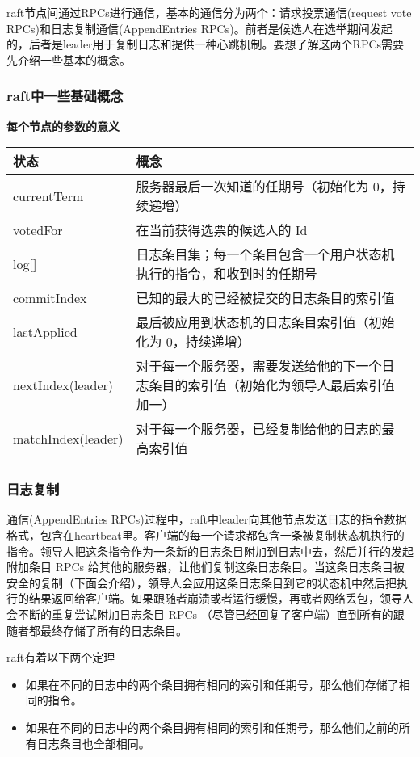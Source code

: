 \documentclass[
]{article}
\begin{document}
raft节点间通过RPCs进行通信，基本的通信分为两个：请求投票通信(request
vote RPCs)和日志复制通信(AppendEntries
RPCs)。前者是候选人在选举期间发起的，后者是leader用于复制日志和提供一种心跳机制。要想了解这两个RPCs需要先介绍一些基本的概念。

\hypertarget{header-n43}{%
\subsubsection{raft中一些基础概念}\label{header-n43}}

\textbf{每个节点的参数的意义}

\begin{longtable}[]{@{}ll@{}}
\toprule
状态 & 概念\tabularnewline
\midrule
\endhead
currentTerm & 服务器最后一次知道的任期号（初始化为
0，持续递增）\tabularnewline
votedFor & 在当前获得选票的候选人的 Id\tabularnewline
log{[}{]} &
日志条目集；每一个条目包含一个用户状态机执行的指令，和收到时的任期号\tabularnewline
commitIndex & 已知的最大的已经被提交的日志条目的索引值\tabularnewline
lastApplied & 最后被应用到状态机的日志条目索引值（初始化为
0，持续递增）\tabularnewline
nextIndex(leader) &
对于每一个服务器，需要发送给他的下一个日志条目的索引值（初始化为领导人最后索引值加一）\tabularnewline
matchIndex(leader) &
对于每一个服务器，已经复制给他的日志的最高索引值\tabularnewline
\bottomrule
\end{longtable}

\hypertarget{header-n70}{%
\subsubsection{日志复制}\label{header-n70}}

通信(AppendEntries
RPCs)过程中，raft中leader向其他节点发送日志的指令数据格式，包含在heartbeat里。客户端的每一个请求都包含一条被复制状态机执行的指令。领导人把这条指令作为一条新的日志条目附加到日志中去，然后并行的发起附加条目
RPCs
给其他的服务器，让他们复制这条日志条目。当这条日志条目被安全的复制（下面会介绍），领导人会应用这条日志条目到它的状态机中然后把执行的结果返回给客户端。如果跟随者崩溃或者运行缓慢，再或者网络丢包，领导人会不断的重复尝试附加日志条目
RPCs
（尽管已经回复了客户端）直到所有的跟随者都最终存储了所有的日志条目。

raft有着以下两个定理

\begin{itemize}
\item
  如果在不同的日志中的两个条目拥有相同的索引和任期号，那么他们存储了相同的指令。
\item
  如果在不同的日志中的两个条目拥有相同的索引和任期号，那么他们之前的所有日志条目也全部相同。
\end{itemize}
\end{document}
